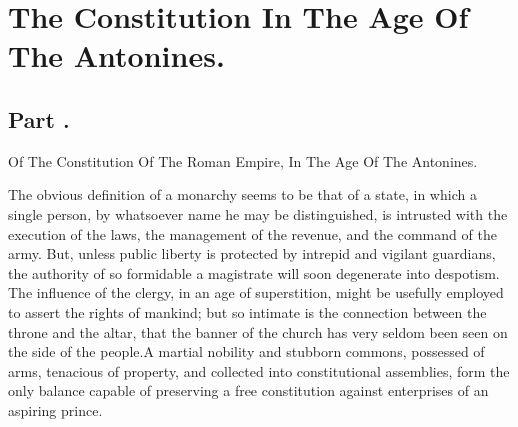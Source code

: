 \chapter{The Constitution In The Age Of The Antonines.}
\section{Part \thesection.}

Of The Constitution Of The Roman Empire, In The Age Of The
Antonines.
\vspace{\onelineskip}

The obvious definition of a monarchy seems to be that of a state,
in which a single person, by whatsoever name he may be
distinguished, is intrusted with the execution of the laws, the
management of the revenue, and the command of the army. But,
unless public liberty is protected by intrepid and vigilant
guardians, the authority of so formidable a magistrate will soon
degenerate into despotism. The influence of the clergy, in an age
of superstition, might be usefully employed to assert the rights
of mankind; but so intimate is the connection between the throne
and the altar, that the banner of the church has very seldom been
seen on the side of the people.\footnotemark[101] A martial nobility and
stubborn commons, possessed of arms, tenacious of property, and
collected into constitutional assemblies, form the only balance
capable of preserving a free constitution against enterprises of
an aspiring prince.


